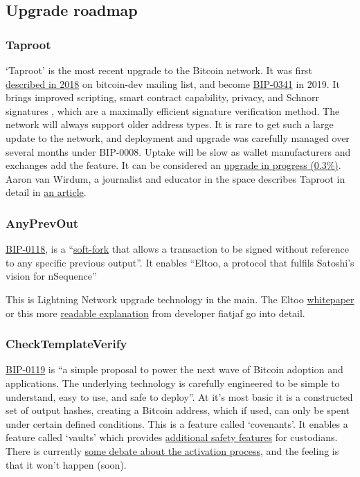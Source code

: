 \subsection{Upgrade roadmap}
\subsubsection{Taproot}
`Taproot' is the most recent upgrade to the Bitcoin network. It was first \href{https://lists.linuxfoundation.org/pipermail/bitcoin-dev/2018-January/015614.html}{described in 2018} on bitcoin-dev mailing list, and become \href{https://github.com/bitcoin/bips/blob/master/bip-0341.mediawiki}{BIP-0341} in 2019. It brings improved scripting, smart contract capability, privacy, and Schnorr signatures \cite{schnorr1989efficient}, which are a maximally efficient signature verification method. The network will always support older address types. It is rare to get such a large update to the network, and deployment and upgrade was carefully managed over several months under BIP-0008. Uptake will be slow as wallet manufacturers and exchanges add the feature. It can be considered an \href{https://transactionfee.info/charts/transactions-spending-taproot/}{upgrade in progress (0.3\%)}. Aaron van Wirdum, a journalist and educator in the space describes Taproot in detail in \href{https://bitcoinmagazine.com/technical/taproot-coming-what-it-and-how-it-will-benefit-bitcoin}{an article}.\par
\subsubsection{AnyPrevOut}
\href{https://anyprevout.xyz}{BIP-0118}, is a ``\href{https://en.bitcoin.it/wiki/Softfork}{soft-fork} that allows a transaction to be signed without reference to any specific previous output''. It enables ``Eltoo, a protocol that fulfils Satoshi's vision for nSequence''\par
This is Lightning Network upgrade technology in the main. The Eltoo \href{https://blockstream.com/eltoo.pdf}{whitepaper} or this more \href{https://fiatjaf.alhur.es/ffdfe772.html}{readable explanation} from developer fiatjaf go into detail.\par 
\subsubsection{CheckTemplateVerify}
\href{https://utxos.org/}{BIP-0119} is ``a simple proposal to power the next wave of Bitcoin adoption and applications. The underlying technology is carefully engineered to be simple to understand, easy to use, and safe to deploy''. At it's most basic it is a constructed set of output hashes, creating a Bitcoin address, which if used, can only be spent under certain defined conditions. This is a feature called `covenants'. It enables a feature called `vaults' which provides \href{https://github.com/jamesob/simple-ctv-vault/blob/7dd6c4ca25debb2140cdefb79b302c65d1b24937/README.md}{additional safety features} for custodians. There is currently \href{https://blog.bitmex.com/op_ctv-summer-softfork-shenanigans/}{some debate about the activation process}, and the feeling is that it won't happen (soon).
